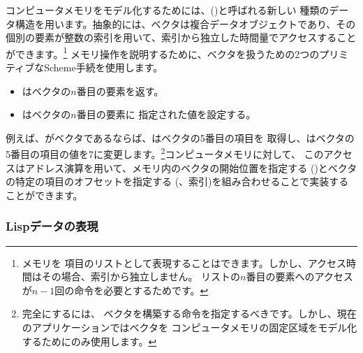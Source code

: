 コンピュータメモリをモデル化するためには、()と呼ばれる新しい
種類のデータ構造を用います。抽象的には、ベクタは複合データオブジェクトであり、その
個別の要素が整数の索引を用いて、索引から独立した時間量でアクセスすることができます。\footnote{メモリを
項目のリストとして表現することはできます。しかし、アクセス時間はその場合、索引から独立しません。
リストの\( n \)番目の要素へのアクセスが\( n - 1 \)回の命令を必要とするためです。}
メモリ操作を説明するために、ベクタを扱うための2つのプリミティブなScheme手続を使用します。

\begin{itemize}

\item
{}はベクタの\( n \)番目の要素を返す。

\item
{}はベクタの\( n \)番目の要素に
指定された値を設定する。

\end{itemize}

\noindent
例えば、がベクタであるならば、はベクタの5番目の項目を
取得し、はベクタの5番目の項目の値を7に変更します。\footnote{完全にするには、
ベクタを構築する命令を指定するべきです。しかし、現在のアプリケーションではベクタを
コンピュータメモリの固定区域をモデル化するためにのみ使用します。}コンピュータメモリに対して、
このアクセスはアドレス演算を用いて、メモリ内のベクタの開始位置を指定する
()とベクタの特定の項目のオフセットを指定する
(、索引)を組み合わせることで実装することができます。

\subsubsection*{Lispデータの表現}

